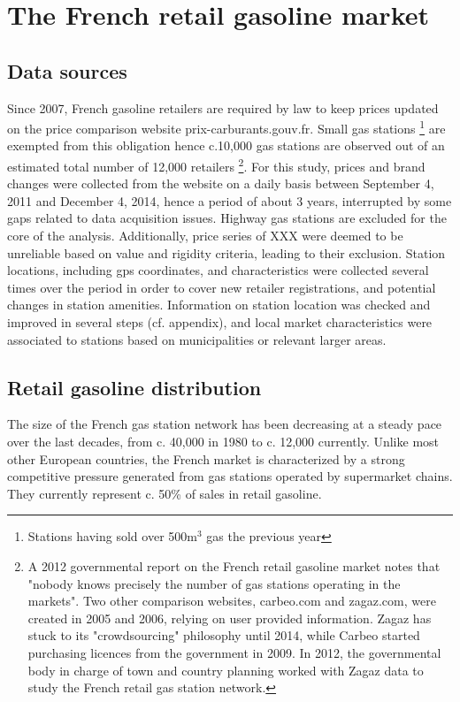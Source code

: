 \documentclass[english]{article}
\begin{document}
\section{The French retail gasoline market}

\subsection{Data sources}

Since 2007, French gasoline retailers are required by law to keep prices updated on the price comparison website prix-carburants.gouv.fr. Small gas stations%
\footnote{Stations having sold over 500m$^{3}$ gas the previous year%
} are exempted from this obligation hence c.10,000 gas stations are observed out of an estimated total number of 12,000 retailers%
\footnote{A 2012 governmental report on the French retail gasoline market notes that "nobody knows precisely the number of gas stations operating in the markets". Two other comparison websites, carbeo.com and zagaz.com, were created in 2005 and 2006, relying on user provided information. Zagaz has stuck to its "crowdsourcing" philosophy until 2014, while Carbeo started purchasing licences from the government in 2009. In 2012, the governmental body in charge of town and country planning worked with Zagaz data to study the French retail gas station network.%
}. For this study, prices and brand changes were collected from the website on a daily basis between September 4, 2011 and December 4, 2014, hence a period of about 3 years, interrupted by some gaps related to data acquisition issues. Highway gas stations are excluded for the core of the analysis. Additionally, price series of XXX were deemed to be unreliable based on value and rigidity criteria, leading to their exclusion. Station locations, including gps coordinates, and characteristics were collected several times over the period in order to cover new retailer registrations, and potential changes in station amenities. Information on station location was checked and improved in several steps (cf. appendix), and local market characteristics were associated to stations based on municipalities or relevant larger areas.

\subsection{Retail gasoline distribution}

The size of the French gas station network has been decreasing at a steady pace over the last decades, from c. 40,000 in 1980 to c. 12,000 currently.  Unlike most other European countries, the French market is characterized by a strong competitive pressure generated from gas stations operated by supermarket chains. They currently represent c. 50\% of sales in retail gasoline.
\end{document}
